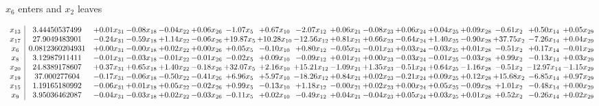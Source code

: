 \documentclass[9pt]{article}
\begin{document}
 $ x_{6} $ enters and $ x_{2} $ leaves 

 \[\begin{array}{c| c c@{\hskip 2pt} c@{\hskip 2pt} c@{\hskip 2pt} c@{\hskip 2pt} c@{\hskip 2pt} c@{\hskip 2pt} c@{\hskip 2pt} c@{\hskip 2pt} c@{\hskip 2pt} c@{\hskip 2pt} c@{\hskip 2pt} c@{\hskip 2pt} c@{\hskip 2pt} c@{\hskip 2pt} c@{\hskip 2pt} }
 x_{13}   &  3.44450537499 & +  0.01 x_{31} & -0.08 x_{18} & -0.04 x_{22} & +  0.06 x_{26} & -1.07 x_{5} & +  0.67 x_{10} & -2.07 x_{12} & +  0.06 x_{21} & -0.08 x_{23} & +  0.06 x_{24} & +  0.04 x_{25} & +  0.09 x_{28} & -0.61 x_{2} & +  0.50 x_{14} & +  0.05 x_{29}\\
 x_{17}   &  27.9049483901 & -0.24 x_{31} & -0.59 x_{18} & +  1.14 x_{22} & -0.06 x_{26} & + 19.87 x_{5} & + 10.28 x_{10} & -12.56 x_{12} & +  0.81 x_{21} & +  0.66 x_{23} & -0.64 x_{24} & +  1.40 x_{25} & -0.90 x_{28} & + 37.75 x_{2} & -7.26 x_{14} & +  0.04 x_{29}\\
 x_{6}   &  0.0812360204931 & +  0.00 x_{31} & -0.00 x_{18} & +  0.02 x_{22} & +  0.00 x_{26} & +  0.05 x_{5} & -0.10 x_{10} & +  0.80 x_{12} & -0.05 x_{21} & -0.01 x_{23} & +  0.03 x_{24} & -0.03 x_{25} & +  0.01 x_{28} & -0.51 x_{2} & +  0.17 x_{14} & -0.01 x_{29}\\
 x_{8}   &  3.12987911411 & -0.01 x_{31} & -0.03 x_{18} & -0.01 x_{22} & -0.01 x_{26} & -0.02 x_{5} & +  0.09 x_{10} & -0.09 x_{12} & +  0.01 x_{21} & +  0.00 x_{23} & -0.03 x_{24} & -0.01 x_{25} & -0.03 x_{28} & +  0.99 x_{2} & -0.13 x_{14} & +  0.03 x_{29}\\
 x_{20}   &  24.8389178607 & +  0.37 x_{31} & +  0.65 x_{18} & +  1.40 x_{22} & -0.18 x_{26} & + 32.07 x_{5} & +  2.16 x_{10} & + 15.21 x_{12} & -1.09 x_{21} & +  1.35 x_{23} & -0.51 x_{24} & +  0.64 x_{25} & -1.16 x_{28} & -0.51 x_{2} & -12.97 x_{14} & -1.15 x_{29}\\
 x_{19}   &  37.000277604 & -0.17 x_{31} & -0.06 x_{18} & -0.50 x_{22} & -0.41 x_{26} & +  6.96 x_{5} & +  5.97 x_{10} & -18.26 x_{12} & +  0.84 x_{21} & +  0.02 x_{23} & -0.21 x_{24} & +  0.09 x_{25} & +  0.12 x_{28} & + 15.68 x_{2} & -6.85 x_{14} & +  0.97 x_{29}\\
 x_{15}   &  1.19165180992 & -0.06 x_{31} & +  0.01 x_{18} & +  0.05 x_{22} & -0.02 x_{26} & +  0.99 x_{5} & -0.13 x_{10} & +  1.18 x_{12} & -0.00 x_{21} & +  0.02 x_{23} & +  0.00 x_{24} & +  0.05 x_{25} & -0.09 x_{28} & +  1.01 x_{2} & -0.48 x_{14} & +  0.00 x_{29}\\
 x_{9}   &  3.95036462087 & -0.04 x_{31} & -0.03 x_{18} & +  0.02 x_{22} & -0.03 x_{26} & -0.11 x_{5} & +  0.02 x_{10} & -0.49 x_{12} & +  0.04 x_{21} & -0.04 x_{23} & +  0.05 x_{24} & +  0.03 x_{25} & +  0.01 x_{28} & +  0.52 x_{2} & -0.26 x_{14} & +  0.02 x_{29}\\

\end{array}\]
\end{document}
